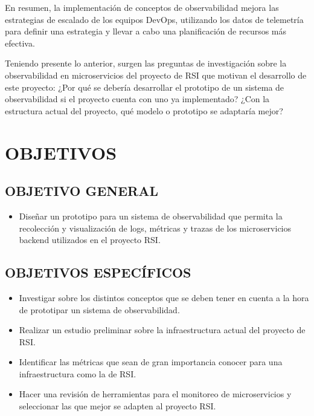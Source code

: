 \documentclass[a4paper,12pt]{article}
\begin{document}
\vspace{12pt}

En resumen, la implementación de conceptos de observabilidad mejora las estrategias de escalado de los equipos DevOps, utilizando los datos de telemetría para definir una estrategia y llevar a cabo una planificación de recursos más efectiva.

\vspace{12pt}

Teniendo presente lo anterior, surgen las preguntas de  investigación sobre la observabilidad en microservicios del proyecto de RSI que motivan el desarrollo de este proyecto: ¿Por qué se debería desarrollar el prototipo de un sistema de observabilidad si el proyecto cuenta con uno ya implementado? ¿Con la estructura actual del proyecto, qué modelo o prototipo se adaptaría mejor?


\section{\large OBJETIVOS}
\subsection{\normalsize OBJETIVO GENERAL}
\begin{itemize}
	\item Diseñar un prototipo para un sistema de observabilidad que permita la recolección y visualización de logs, métricas y trazas de los microservicios backend utilizados en el proyecto RSI.
\end{itemize}

\subsection{\normalsize OBJETIVOS ESPECÍFICOS}

\begin{itemize}
    \item Investigar sobre los distintos conceptos que se deben tener en cuenta a la hora de prototipar un sistema de observabilidad. 
    \item Realizar un estudio preliminar sobre la  infraestructura actual del proyecto de RSI.
    \item Identificar las métricas que sean de gran importancia conocer para una infraestructura como la de RSI.
    \item Hacer una revisión de herramientas para el monitoreo de microservicios y seleccionar las que mejor se adapten al proyecto RSI.
\end{itemize}
\end{document}
